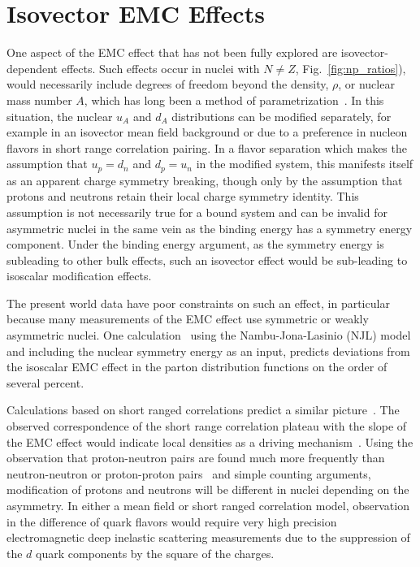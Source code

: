 \section{Isovector EMC Effects\label{sec:ivemc}}
%
One aspect of the EMC effect that has not been fully explored are isovector-dependent effects.  Such effects occur in nuclei with $N \neq Z$, Fig.~\ref{fig:np_ratios}), would necessarily include degrees of freedom beyond the density, $\rho$, or nuclear mass number $A$, which has long been a method of parametrization~\cite{Malace:2014uea}.  In this situation, the nuclear $u_A$ and $d_A$ distributions can be modified separately, for example in an isovector mean field background or due to a preference in nucleon flavors in short range correlation pairing.  In a flavor separation which makes the assumption that $u_p = d_n$ and $d_p = u_n$ in the modified system, this manifests itself as an apparent charge symmetry breaking, though only by the assumption that protons and neutrons retain their local charge symmetry identity. This assumption is not necessarily true for a bound system and can be invalid for asymmetric nuclei in the same vein as the binding energy has a symmetry energy component.  Under the binding energy argument, as the symmetry energy is subleading to other bulk effects, such an isovector effect would be sub-leading to isoscalar modification effects.

The present world data have poor constraints on such an effect, in particular because many measurements of the EMC effect use symmetric or weakly asymmetric nuclei. One calculation~\cite{Cloet:2009qs,Cloet:2012td} using the Nambu-Jona-Lasinio (NJL) model and including the nuclear symmetry energy as an input, predicts deviations from the isoscalar EMC effect in the parton distribution functions on the order of several percent.   

Calculations based on short ranged correlations predict a similar picture~\cite{Sargsian:2012sm, Arrington:2015wja}.  The observed correspondence of the short range correlation plateau with the slope of the EMC effect would indicate local densities as a driving mechanism~\cite{Weinstein:2010rt}.  Using the observation that proton-neutron pairs are found much more frequently than neutron-neutron or proton-proton pairs~\cite{Subedi:2008zz} and simple counting arguments, modification of protons and neutrons will be different in nuclei depending on the asymmetry.  In either a mean field or short ranged correlation model, observation in the difference of quark flavors would require very high precision electromagnetic deep inelastic scattering measurements due to the suppression of the $d$ quark components by the square of the charges. 

